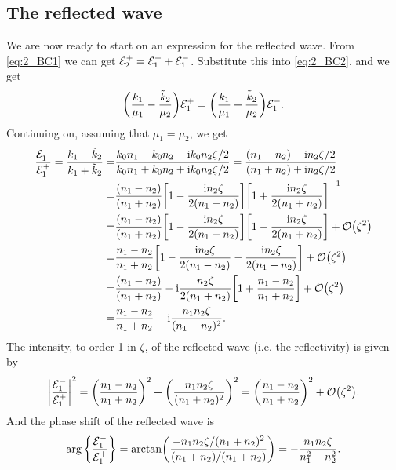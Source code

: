 \documentclass[11pt,letter, swedish, english
]{article}
\begin{document}
\subsection{The reflected wave}
We are now ready to start on an expression for the reflected wave. 
From \eqref{eq:2_BC1} we can get ${\mathcal{E}_2^+}={\mathcal{E}_1^+}+{\mathcal{E}_1^-}$. Substitute this into
\eqref{eq:2_BC2}, and we get
\begin{equation}
\qty(\frac{k_1}{\mu_1} - \frac{\tilde{k}_2}{\mu_2}){\mathcal{E}_1^+} 
=\qty(\frac{k_1}{\mu_1} + \frac{\tilde{k}_2}{\mu_2}){\mathcal{E}_1^-}.
\end{equation}
Continuing on, assuming that $\mu_1=\mu_2$, we get
\begin{equation}
\begin{aligned}
\frac{\Em}{\Ep} 
= \frac{k_1-\kt_2}{k_1+\kt_2}
=& \frac{k_0n_1 - k_0n_2 - \ii k_0n_2\zeta/2}
{k_0n_1 + k_0n_2 + \ii k_0n_2\zeta/2}
= \frac{(n_1-n_2) - \ii n_2\zeta/2}
{(n_1+n_2) + \ii n_2\zeta/2}\\
=&\frac{(n_1-n_2)}{(n_1+n_2)}
\qty[1-\frac{\ii n_2\zeta}{2(n_1-n_2)}]
\qty[1+\frac{\ii n_2\zeta}{2(n_1+n_2)}]^{-1}\\
=&\frac{(n_1-n_2)}{(n_1+n_2)}
\qty[1-\frac{\ii n_2\zeta}{2(n_1-n_2)}]
\qty[1-\frac{\ii n_2\zeta}{2(n_1+n_2)}] +\order{\zeta^2}\\
=&\frac{n_1-n_2}{n_1+n_2}
\qty[1-\frac{\ii n_2\zeta}{2(n_1-n_2)}
-\frac{\ii n_2\zeta}{2(n_1+n_2)}] +\order{\zeta^2}\\
=&\frac{(n_1-n_2)}{(n_1+n_2)}
-\ii\frac{n_2\zeta}{2(n_1+n_2)}
\qty[1+\frac{n_1-n_2}{n_1+n_2}]+\order{\zeta^2}\\
=&\frac{n_1-n_2}{n_1+n_2}
-\ii\frac{n_1n_2\zeta}{(n_1+n_2)^2}.
\end{aligned}
\end{equation}
The intensity, to order 1 in $\zeta$, of the reflected wave (i.e. the
reflectivity) is given by
\begin{equation}
\abs{\frac{\Em}{\Ep}}^2 
= \qty(\frac{n_1-n_2}{n_1+n_2})^2
+\qty(\frac{n_1n_2\zeta}{(n_1+n_2)^2})^2
=\qty(\frac{n_1-n_2}{n_1+n_2})^2 + \order{\zeta^2}.
\end{equation}
And the phase shift of the reflected wave is
\begin{equation}
\arg\qty{\frac{{\mathcal{E}_1^-}}{{\mathcal{E}_1^+}}} 
= \arctan(\frac{-n_1n_2\zeta/(n_1+n_2)^2}{(n_1+n_2)/(n_1+n_2)})
= -\frac{n_1n_2\zeta}{n_1^2-n_2^2}.
\end{equation}
\end{document}
